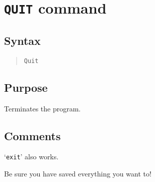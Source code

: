 %
%
%
%
\section{{\tt QUIT} command}
\subsection{Syntax}
\begin{verse}
{\tt Quit}
\end{verse}
\subsection{Purpose}

Terminates the program.
\subsection{Comments}

`{\tt exit}' also works.

Be sure you have saved everything you want to!
